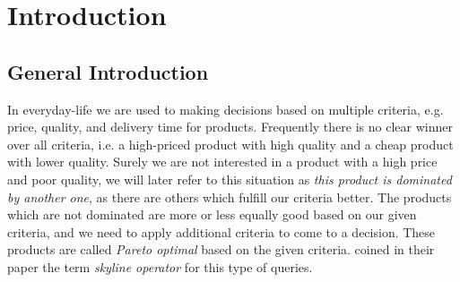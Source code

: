 
\newcommand\nospellcheck[1]{#1}%
\newcommand\naive{\nospellcheck{na\"{\i}ve}\xspace}%
\newcommand\Naive{\nospellcheck{Na\"{\i}ve}\xspace}%





\chapter{Introduction}
\label{chap:introduction}

\section{General Introduction}
\label{sec:generalintroduction}

In everyday-life we are used to making decisions based on multiple
criteria, e.g. price, quality, and delivery time for products.  Frequently there is no
clear winner over all criteria, i.e. a high-priced product with high
quality and a cheap product with lower quality.  Surely we are not
interested in a product with a high price and poor quality, we will
later refer to this situation as \emph{this product is dominated by
another one}, as there are others which fulfill our criteria better.  The
products which are not dominated are more or less equally good based on
our given criteria, and we need to apply additional criteria to come to a
decision.  These products are called \emph{Pareto optimal}
based on the given criteria. \citet{Borzsonyi2001} coined in their
paper the term \emph{skyline operator} for this type of queries.

